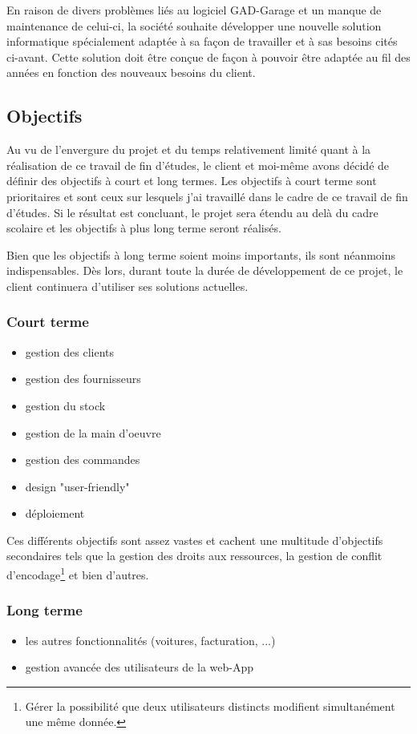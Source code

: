 \newpara

En raison de divers problèmes liés au logiciel GAD-Garage et un manque de maintenance de celui-ci, la société souhaite développer une nouvelle solution informatique spécialement adaptée à sa façon de travailler et à sas besoins cités ci-avant. Cette solution doit être conçue de façon à pouvoir être adaptée au fil des années en fonction des nouveaux besoins du client.

\subsection{Objectifs}

Au vu de l'envergure du projet et du temps relativement limité quant à la réalisation de ce travail de fin d'études, le client et moi-même avons décidé de définir des objectifs à court et long termes. Les objectifs à court terme sont prioritaires et sont ceux sur lesquels j'ai travaillé dans le cadre de ce travail de fin d'études. Si le résultat est concluant, le projet sera étendu au delà du cadre scolaire et les objectifs à plus long terme seront réalisés. 

\newpara

Bien que les objectifs à long terme soient moins importants, ils sont néanmoins indispensables. Dès lors, durant toute la durée de développement de ce projet, le client continuera d'utiliser ses solutions actuelles. 

\subsubsection{Court terme}

\begin{itemize}
  \item gestion des clients 
  \item gestion des fournisseurs
  \item gestion du stock
  \item gestion de la main d'oeuvre
  \item gestion des commandes 
  \item design "user-friendly"
  \item déploiement
\end{itemize}

\newpara

Ces différents objectifs sont assez vastes et cachent une multitude d'objectifs secondaires tels que la gestion des droits aux ressources, la gestion de conflit d'encodage\footnote{Gérer la possibilité que deux utilisateurs distincts modifient simultanément une même donnée.} et bien d'autres.  

\subsubsection{Long terme}

\begin{itemize}
  \item les autres fonctionnalités (voitures, facturation, ...)
  \item gestion avancée des utilisateurs de la web-App
\end{itemize}
